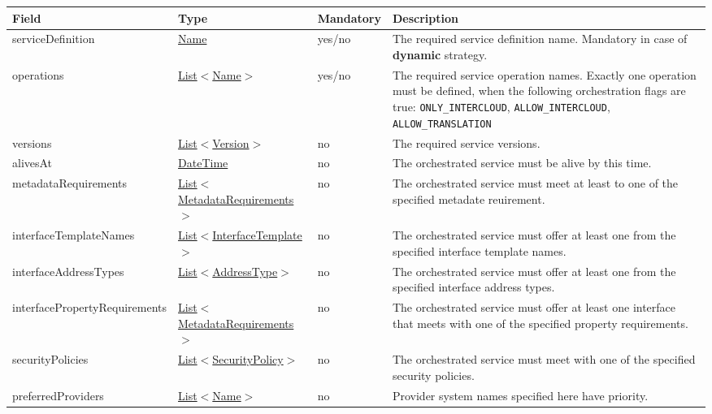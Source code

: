 \documentclass[a4paper]{arrowhead}
\newcommand{\pref}[1]{{\textcolor{ArrowheadGrey}{\hyperref[sec:model:primitives:#1]{#1}}}}
\begin{document}
\begin{table}[ht!]
\begin{tabularx}{\textwidth}{| p{4.8cm} | p{4.7cm} | p{2cm} | X |} \hline
\rowcolor{gray!33} Field & Type & Mandatory & Description \\ \hline
serviceDefinition & \pref{Name} & yes/no & The required service definition name. Mandatory in case of \textbf{dynamic} strategy. \\ \hline
operations & \pref{List}$<$\pref{Name}$>$ & yes/no & The required service operation names. \newline 
Exactly one operation must be defined, when the following orchestration flags are true: \newline \texttt{ONLY\_INTERCLOUD}, \texttt{ALLOW\_INTERCLOUD}, \texttt{ALLOW\_TRANSLATION} \\ \hline
versions & \pref{List}$<$\pref{Version}$>$ & no & The required service versions. \\ \hline 
alivesAt & \pref{DateTime} & no & The orchestrated service must be alive by this time. \\ \hline
metadataRequirements & \pref{List}$<$\hyperref[sec:model:MetadataRequirements]{MetadataRequirements}$>$ & no & The orchestrated service must meet at least to one of the specified metadate reuirement. \\ \hline
interfaceTemplateNames & \pref{List}$<$\pref{InterfaceTemplate}$>$ & no & The orchestrated service must offer at least one from the specified interface template names. \\ \hline 
interfaceAddressTypes & \pref{List}$<$\pref{AddressType}$>$ & no & The orchestrated service must offer at least one from the specified interface address types. \\ \hline
interfacePropertyRequirements & \pref{List}$<$\hyperref[sec:model:MetadataRequirements]{MetadataRequirements}$>$ & no & The orchestrated service must offer at least one interface that meets with one of the specified property requirements. \\ \hline
securityPolicies & \pref{List}$<$\pref{SecurityPolicy}$>$ & no & The orchestrated service must meet with one of the specified security policies. \\ \hline
preferredProviders & \pref{List}$<$\pref{Name}$>$ & no & Provider system names specified here have priority. \\ \hline
\end{tabularx}
\end{table}
\end{document}
